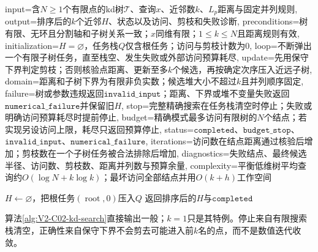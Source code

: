 \begin{AlgorithmContract}{
  input={含$N\ge1$个有限点的kd树$\mathcal T$、查询$x$、近邻数$k$、$L_p$距离与固定并列规则},
  output={排序后的$k$个近邻$H$、状态以及访问、剪枝和失败诊断},
  preconditions={树有限、无环且分割轴和子树关系一致；$x$同维有限；$1\le k\le N$且距离规则有效},
  initialization={$H=\varnothing$，任务栈$Q$仅含根任务；访问与剪枝计数为$0$},
  loop={不断弹出一个有限子树任务，直至栈空、发生失败或外部访问预算耗尽},
  update={先用保守下界判定剪枝；否则核验点距离、更新至多$k$个候选，再按确定次序压入近远子树},
  domain={距离和子树下界为有限非负实数；候选堆大小不超过$k$且并列顺序固定},
  failure={树或参数违规返回$\mathtt{invalid\_input}$；距离、下界或堆不变量失败返回$\mathtt{numerical\_failure}$并保留旧$H$},
  stop={完整精确搜索在任务栈清空时停止；失败或明确访问预算耗尽时提前停止},
  budget={精确模式最多访问有限树的$N$个结点；若实现另设访问上限，耗尽只返回预算停止},
  status={$\mathtt{completed}$、$\mathtt{budget\_stop}$、$\mathtt{invalid\_input}$、$\mathtt{numerical\_failure}$},
  iterations={访问数在结点距离通过核验后增加；剪枝数在一个子树任务被合法排除后增加},
  diagnostics={失败结点、最终候选半径、访问数、剪枝数、距离并列数与预算余量},
  complexity={平衡低维树平均查询约$O(\log N+k\log k)$；最坏访问全部结点并用$O(k+h)$工作空间}
}
\begin{algorithm}[H]
\caption{kd树的精确\kNN{}搜索}\label{alg:V2-C02-kd-search}
$H\leftarrow\varnothing$，把根任务$(\operatorname{root},0)$压入$Q$\;
返回排序后的$H$与$\mathtt{completed}$\;
\end{algorithm}
\end{AlgorithmContract}

算法\ref{alg:V2-C02-kd-search}直接输出一般\kNN{}；$k=1$只是其特例。停止来自有限搜索栈清空，正确性来自保守下界不会剪去可能进入前$k$名的点，而不是数值迭代收敛。


